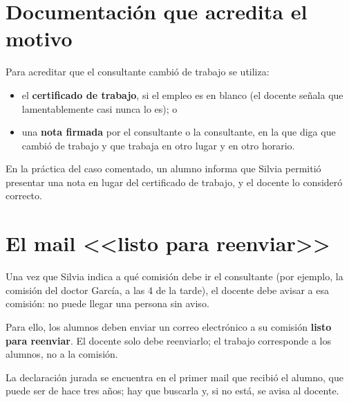 \documentclass[12pt,oneside]{book}
\begin{document}
\section{Documentación que acredita el motivo}

Para acreditar que el consultante cambió de trabajo se utiliza:

\begin{itemize}
    \item el \textbf{certificado de trabajo}, si el empleo es en blanco (el docente señala que lamentablemente casi nunca lo es); o
    \item una \textbf{nota firmada} por el consultante o la consultante, en la que diga que cambió de trabajo y que trabaja en otro lugar y en otro horario.
\end{itemize}

\begin{note}
En la práctica del caso comentado, un alumno informa que Silvia permitió presentar una nota en lugar del certificado de trabajo, y el docente lo consideró correcto.
\end{note}

\section{El mail <<listo para reenviar>>}

Una vez que Silvia indica a qué comisión debe ir el consultante (por ejemplo, la comisión del doctor García, a las 4 de la tarde), el docente debe avisar a esa comisión: no puede llegar una persona sin aviso.

Para ello, los alumnos deben enviar un correo electrónico a su comisión \textbf{listo para reenviar}. El docente solo debe reenviarlo; el trabajo corresponde a los alumnos, no a la comisión.

La declaración jurada se encuentra en el primer mail que recibió el alumno, que puede ser de hace tres años; hay que buscarla y, si no está, se avisa al docente.
\end{document}
